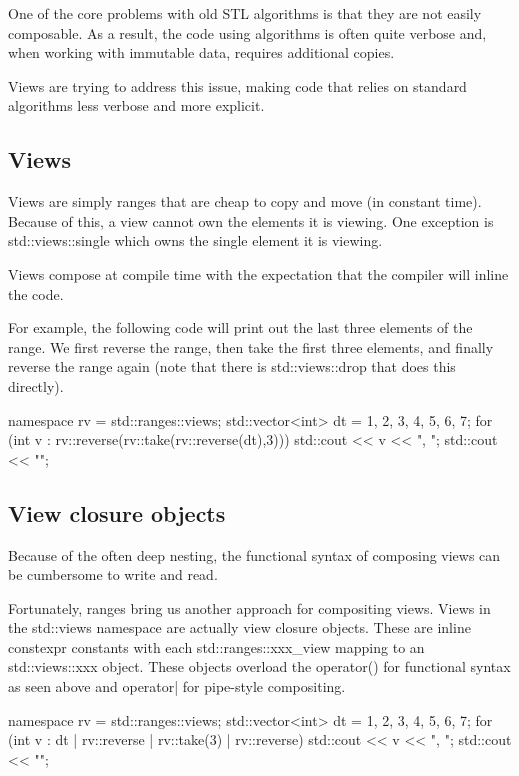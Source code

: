 One of the core problems with old STL algorithms is that they are not easily composable. As a result, the code using algorithms is often quite verbose and, when working with immutable data, requires additional copies.

Views are trying to address this issue, making code that relies on standard algorithms less verbose and more explicit.

\subsection{Views}

Views are simply ranges that are cheap to copy and move (in constant time). Because of this, a view cannot own the elements it is viewing. One exception is std::views::single which owns the single element it is viewing.

Views compose at compile time with the expectation that the compiler will inline the code.

For example, the following code will print out the last three elements of the range. We first reverse the range, then take the first three elements, and finally reverse the range again (note that there is std::views::drop that does this directly).

\begin{box-note}
\begin{cppcode}
namespace rv = std::ranges::views;
std::vector<int> dt = {1, 2, 3, 4, 5, 6, 7};
for (int v : rv::reverse(rv::take(rv::reverse(dt),3))) {
    std::cout << v << ", ";
}
std::cout << "\n";
\end{cppcode}
\end{box-note}

\subsection{View closure objects}

Because of the often deep nesting, the functional syntax of composing views can be cumbersome to write and read.

Fortunately, ranges bring us another approach for compositing views. Views in the std::views namespace are actually view closure objects. These are inline constexpr constants with each std::ranges::xxx\_view mapping to an std::views::xxx object. These objects overload the operator() for functional syntax as seen above and operator| for pipe-style compositing.

\begin{box-note}
\begin{cppcode}
namespace rv = std::ranges::views;
std::vector<int> dt = {1, 2, 3, 4, 5, 6, 7};
for (int v : dt | rv::reverse | rv::take(3) | rv::reverse) {
    std::cout << v << ", ";
}
std::cout << "\n";
\end{cppcode}
\end{box-note}

